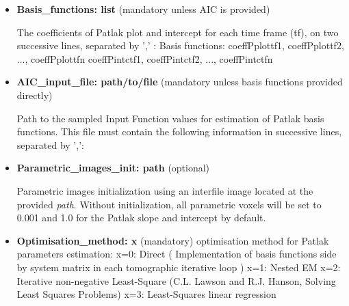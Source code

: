 \documentclass[a4paper, 11pt]{article}
\begin{document}
\begin{itemize}

\item \textbf{Basis\_functions: list}	(mandatory unless AIC is provided)

The coefficients of Patlak plot and intercept for each time frame (tf), on two successive lines, separated by ',' :
Basis functions:
coeffPplottf1, coeffPplottf2, ..., coeffPplottfn
coeffPintctf1, coeffPintctf2, ..., coeffPintctfn

\item \textbf{AIC\_input\_file: path/to/file}	(mandatory unless basis functions provided directly)

Path to the sampled Input Function values for estimation of Patlak basis functions. This file must contain the following information in successive lines, separated by ',': 


\item \textbf{Parametric\_images\_init: path} (optional)

Parametric images initialization using an interfile image located at the provided \textit{path}. Without initialization, all parametric voxels will be set to 0.001 and 1.0 for the Patlak slope and intercept by default.


\item \textbf{Optimisation\_method: x} (mandatory) optimisation method for Patlak parameters estimation:  \newline
x=0: Direct ( Implementation of basis functions side by system matrix in each tomographic iterative loop )
\newline
x=1: Nested EM
\newline
x=2: Iterative non-negative Least-Square (C.L. Lawson and R.J. Hanson, Solving Least Squares Problems)
\newline
x=3: Least-Squares linear regression
\newline
\end{itemize}
\end{document}
